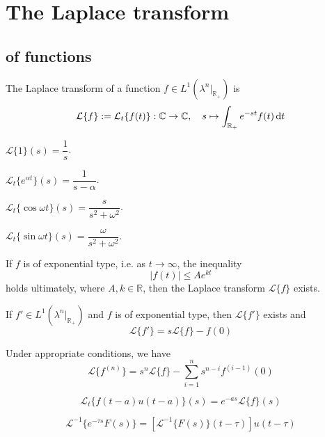 \documentclass[11pt, a4paper, openany]{book}
\theoremstyle{definition}
\newenvironment{tight_enumerate}{\begin{enumerate}\itemsep -0.2em}{\end{enumerate}}
\begin{document}
\section{The Laplace transform}
\subsection{of functions}
    The Laplace transform of a function $f\in L^1(\lambda^n|_{\mathbb{R}_+})$ is
    \[
        \mathcal{L}\{f\}:=\mathcal{L}_t\{f(t)\}:\mathbb{C}\rightarrow\mathbb{C},\quad s\mapsto \int_{\mathbb{R}_+} e^{-st}f(t)\odif t
    \]
    \begin{exam}
        \begin{tight_enumerate}
            \item $\mathcal{L}\{1\}(s)=\dfrac{1}{s}$.
            \item $\mathcal{L}_t\{e^{\alpha t}\}(s)=\dfrac{1}{s-\alpha}$.
            \item $\mathcal{L}_t\{\cos\omega t\}(s)=\dfrac{s}{s^2+\omega^2}$.
            \item $\mathcal{L}_t\{\sin\omega t\}(s)=\dfrac{\omega}{s^2+\omega^2}$.
        \end{tight_enumerate}
    \end{exam}
    \begin{lem}
        If $f$ is of exponential type, i.e. as $t\to\infty$, the inequality
        \[
            |f(t)|\leqslant Ae^{kt}
        \]
        holds ultimately, where $A,k\in\mathbb{R}$, then the Laplace transform $\mathcal{L}\{f\}$ exists.
    \end{lem}
    \begin{lem}
        If $f'\in L^1(\lambda^n|_{\mathbb{R}_+})$ and $f$ is of exponential type, then $\mathcal{L}\{f'\}$ exists and
        \[
            \mathcal{L}\{f'\}=s\mathcal{L}\{f\}-f(0)
        \]
    \end{lem}
    Under appropriate conditions, we have
    \[
        \mathcal{L}\{f^{(n)}\}=s^n\mathcal{L}\{f\}-\sum_{i=1}^ns^{n-i}f^{(i-1)}(0)
    \]
    \begin{lem}
        \[
            \mathcal{L}_t\{f(t-a)u(t-a)\}(s)=e^{-as}\mathcal{L}\{f\}(s)
        \]
    \end{lem}
    \[
        \mathcal{L}^{-1}\{e^{-\tau s}F(s)\}=[\mathcal{L}^{-1}\{F(s)\}(t-\tau)]u(t-\tau)
    \]
\end{document}
